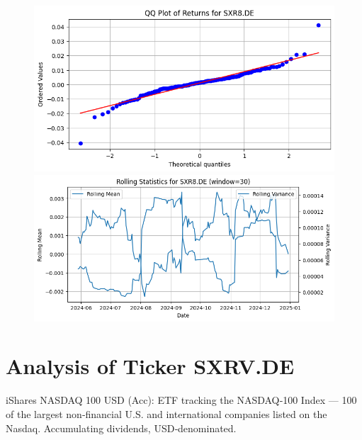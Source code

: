 \documentclass{article}%
\begin{document}
%


\begin{figure}[htbp]%
\begin{minipage}{0.48\textwidth}%
\includegraphics[width=\linewidth]{ticker_images/SXR8.DE_qq_plot.png}%
\end{minipage}%
\begin{minipage}{0.48\textwidth}%
\includegraphics[width=\linewidth]{ticker_images/SXR8.DE_rolling_stats.png}%
\end{minipage}%
\end{figure}

%
\section*{Analysis of Ticker SXRV.DE}%
\label{sec:AnalysisofTickerSXRV.DE}%
iShares NASDAQ 100 USD (Acc): ETF tracking the NASDAQ‑100 Index — 100 of the largest non‑financial U.S. and international companies listed on the Nasdaq. Accumulating dividends, USD‑denominated.%
\end{document}

